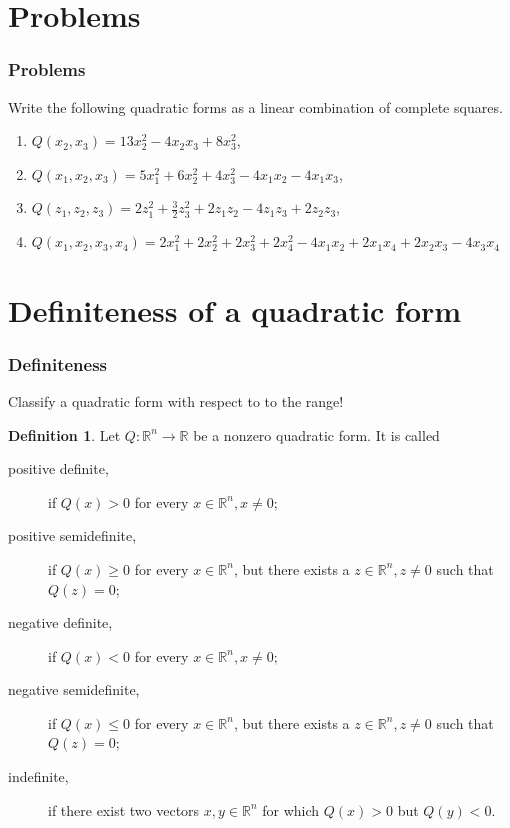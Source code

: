 \documentclass[aspectratio=169,notheorems]{corvinusmetropolis}
\theoremstyle{definition}
\newtheorem{definition}[theorem]{Definition}
\begin{document}
\section{Problems}
\begin{frame}
    \frametitle{Problems}
    \begin{block}{ Write the following quadratic forms as a linear combination of complete squares.}
        \begin{enumerate}
            \item 
            $Q\left( x_2,x_3 \right)=13x_2^2-4x_2x_3+8x_3^2$,
            \item
            $Q\left( x_1,x_2,x_3 \right)=5x_1^2+6x_2^2+4x_3^2-4x_1x_2-4x_1x_3$,
            \item
            $Q\left( z_1,z_2,z_3 \right)=2z_1^2+\frac{3}{2}z_3^2+2z_1z_2-4z_1z_3+2z_2z_3$,
            \item
            $Q\left( x_1,x_2,x_3,x_4 \right)=2x_1^2+2x_2^2+2x_3^2+2x_4^2-4x_1x_2+2x_1x_4+2x_2x_3-4x_3x_4$
        \end{enumerate}
    \end{block}
\end{frame}
\section{Definiteness of a quadratic form}
\begin{frame}
    \frametitle{Definiteness}
    Classify a quadratic form with respect to to the range!
    \begin{definition}
        Let $Q:\mathbb{R}^n\to\mathbb{R}$ be a nonzero quadratic form. It is called
        \begin{description}
            \item[positive definite,] if $Q\left( x \right)>0$ for every $x\in\mathbb{R}^n,x\neq 0$;
            \item[positive semidefinite,] if $ Q\left( x \right)\geq 0$ for every $x\in\mathbb{R}^n$,
                but there exists a $z\in\mathbb{R}^n, z\neq 0$ such that $Q\left( z \right)=0$;
            \item[negative definite,] if $ Q\left( x \right)<0$ for every $x\in\mathbb{R}^n,x\neq 0;$
            \item[negative semidefinite,] if $ Q\left( x \right)\leq 0$ for every $x\in\mathbb{R}^n$,
                but there exists a $z\in\mathbb{R}^n, z\neq 0$ such that $Q\left( z \right)=0$;
            \item[indefinite,] if there exist two vectors $x,y\in\mathbb{R}^n$ for which
                $Q\left( x \right)>0$ but $Q\left( y \right)<0$.
        \end{description}
    \end{definition}
\end{frame}
\end{document}
